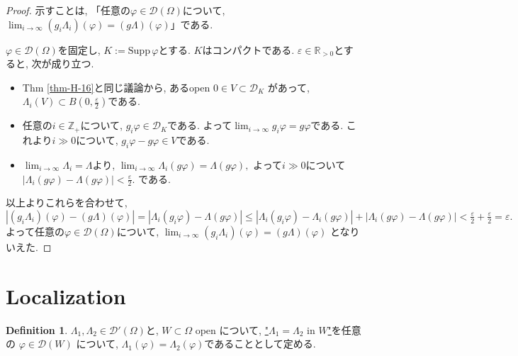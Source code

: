 \documentclass[dvipdfmx,a4paper,11pt]{article} %
\theoremstyle{definition}
\newtheorem{defn}[thm]{Definition}
\theoremstyle{remark}
\numberwithin{equation}{section}
\newcommand{\N}{\mathbb{Z}_+}
\begin{document}
\begin{proof}
示すことは, 「任意の$\varphi \in \mathcal{D}(\Omega)$について, 
$\lim_{i \to \infty} (g_i \Lambda_i)(\varphi) = (g \Lambda)(\varphi)$」である.

$\varphi \in \mathcal{D}(\Omega)$を固定し, $K := \mathrm{Supp}\,\varphi$とする. $K$はコンパクトである. 
$\varepsilon \in \mathbb{R}_{>0}$とすると, 次が成り立つ.
\begin{itemize}
\item Thm \ref{thm-H-16}と同じ議論から,  あるopen $0 \in V \subset \mathcal{D}_K$ があって, 
$\Lambda_i(V) \subset B(0,\tfrac{\varepsilon}{2})$である. 
\item 任意の$i \in \N$について, $g_i \varphi \in \mathcal{D}_K$である. よって$\lim_{i \to \infty} g_i \varphi = g \varphi$である. これより$i \gg 0$について, $g_i \varphi - g \varphi \in V$である.
\item $\lim_{i \to \infty} \Lambda_i = \Lambda$より, 
\(
\lim_{i \to \infty} \Lambda_i(g \varphi) = \Lambda(g \varphi),
\)
よって$ i \gg 0$について
\(
|\Lambda_i(g \varphi) - \Lambda(g \varphi)| < \tfrac{\varepsilon}{2}.
\)
である.
\end{itemize}
以上よりこれらを合わせて, 
\[|(g_i \Lambda_i)(\varphi) - (g \Lambda)(\varphi)| 
= |\Lambda_i(g_i \varphi) - \Lambda(g \varphi)|
\le |\Lambda_i(g_i \varphi) - \Lambda_i(g \varphi)| + |\Lambda_i(g \varphi) - \Lambda(g \varphi)|
< \tfrac{\varepsilon}{2} + \tfrac{\varepsilon}{2} = \varepsilon.
\]
よって任意の$\varphi \in \mathcal{D}(\Omega)$について, 
$\lim_{i \to \infty} (g_i \Lambda_i)(\varphi) = (g \Lambda)(\varphi)$
となりいえた.
\end{proof}


\section{Localization}

\begin{tcolorbox}[mybox]
\begin{defn}{\cite[Def 6.19]{Rud}}
\label{defn-H-18}%
\(\Lambda_1, \Lambda_2 \in \mathcal{D}'(\Omega)\)と, 
\(W \subset \Omega\) open について, 
\underline{"\(\Lambda_1 = \Lambda_2 \text{ in } W\)"}を任意の $\varphi \in \mathcal{D}(W)$
について, \( \Lambda_1(\varphi) = \Lambda_2(\varphi) \)であることとして定める.
\end{defn}
\end{tcolorbox}
\end{document}
